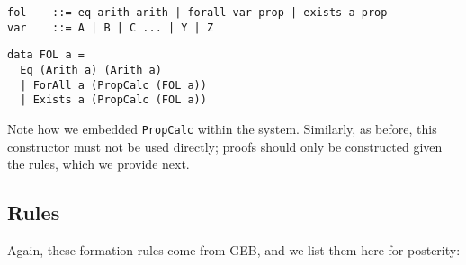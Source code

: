 \documentclass{article}
\begin{document}
\begin{minipage}{0.49\textwidth}
\begin{lstlisting}
fol    ::= eq arith arith | forall var prop | exists a prop
var    ::= A | B | C ... | Y | Z
\end{lstlisting}
\end{minipage}
\begin{minipage}{0.49\textwidth}
\begin{lstlisting}
data FOL a =
  Eq (Arith a) (Arith a)
  | ForAll a (PropCalc (FOL a))
  | Exists a (PropCalc (FOL a))
\end{lstlisting}
\end{minipage}

Note how we embedded \texttt{PropCalc} within the system. Similarly, as before, this constructor must not be used directly; proofs should only be constructed given the rules, which we provide next.

\subsection{Rules}

Again, these formation rules come from GEB, and we list them here for posterity:
\end{document}
